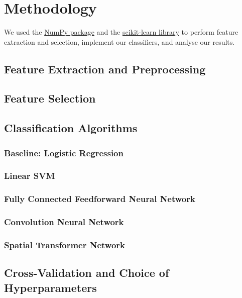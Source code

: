 \documentclass[conference]{IEEEtran}
\begin{document}
\section{Methodology}

We used the \href{http://www.numpy.org/}{NumPy package} and the \href{http://www.scikit-learn.org/}{scikit-learn library} to perform feature extraction and selection, implement our classifiers, and analyse our results. 

\subsection{Feature Extraction and Preprocessing}


\subsection{Feature Selection}

\subsection{Classification Algorithms}

\subsubsection{Baseline: Logistic Regression}

\subsubsection{Linear SVM}

\subsubsection{Fully Connected Feedforward Neural Network}

\subsubsection{Convolution Neural Network}

\subsubsection{Spatial Transformer Network}

\subsection{Cross-Validation and Choice of Hyperparameters}
\end{document}
